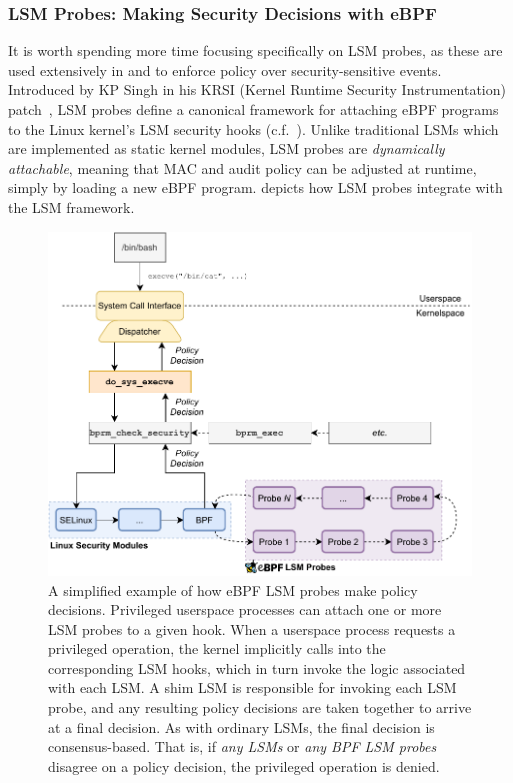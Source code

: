 \subsubsection*{LSM Probes: Making Security Decisions with eBPF}

It is worth spending more time focusing specifically on LSM probes, as these are used
extensively in \bpfbox{} and \bpfcontain{} to enforce policy over security-sensitive
events. Introduced by KP Singh in his KRSI (Kernel Runtime Security Instrumentation)
patch~\cite{singh2019_krsi}, LSM probes define a canonical framework for attaching eBPF
programs to the Linux kernel's LSM security hooks (c.f.~). Unlike
traditional LSMs which are implemented as static kernel modules, LSM probes are
\textit{dynamically attachable}, meaning that MAC and audit policy can be adjusted at
runtime, simply by loading a new eBPF program.   depicts how LSM probes
integrate with the LSM framework.

\begin{figure}[tbp]
  \centering
  \includegraphics[width=0.8\linewidth]{figs/background/bpf-lsm.pdf}
  \caption[How eBPF LSM probes make policy decisions]{A simplified example of how eBPF LSM probes make policy decisions. Privileged userspace processes can attach one or more LSM probes to a given hook. When a userspace process requests a privileged operation, the kernel implicitly calls into the corresponding LSM hooks, which in turn invoke the logic associated with each LSM. A shim LSM is responsible for invoking each LSM probe, and any resulting policy decisions are taken together to arrive at a final decision. As with ordinary LSMs, the final decision is consensus-based. That is, if \textit{any LSMs} or \textit{any BPF LSM probes} disagree on a policy decision, the privileged operation is denied.}%
  \label{fig:bpf-lsm}
\end{figure}

